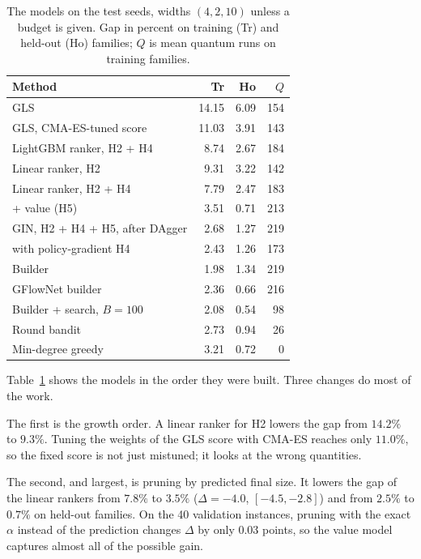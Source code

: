 \documentclass[10pt,pra,aps,twocolumn,superscriptaddress,floatfix,nofootinbib]{revtex4-2}
\newcommand{\GLS}{GLS}
\begin{document}
\begin{table}[t]
\caption{The models on the test seeds, widths $(4,2,10)$ unless a budget is given. Gap in percent on training (Tr) and held-out (Ho) families; $Q$ is mean quantum runs on training families.}
\label{tab:ladder}
\begin{ruledtabular}
\begin{tabular}{lrrr}
Method & Tr & Ho & $Q$ \\
\hline
\GLS{} & 14.15 & 6.09 & 154 \\
\GLS{}, CMA-ES-tuned score & 11.03 & 3.91 & 143 \\
LightGBM ranker, H2 + H4 & 8.74 & 2.67 & 184 \\
Linear ranker, H2 & 9.31 & 3.22 & 142 \\
Linear ranker, H2 + H4 & 7.79 & 2.47 & 183 \\
\quad + value (H5) & 3.51 & 0.71 & 213 \\
GIN, H2 + H4 + H5, after DAgger & 2.68 & 1.27 & 219 \\
\quad with policy-gradient H4 & 2.43 & 1.26 & 173 \\
Builder & 1.98 & 1.34 & 219 \\
GFlowNet builder & 2.36 & 0.66 & 216 \\
Builder + search, $B=100$ & 2.08 & 0.54 & 98 \\
Round bandit & 2.73 & 0.94 & 26 \\
\hline
Min-degree greedy & 3.21 & 0.72 & 0 \\
\end{tabular}
\end{ruledtabular}
\end{table}

Table~\ref{tab:ladder} shows the models in the order they were built. Three changes do most of the work.

The first is the growth order. A linear ranker for H2 lowers the gap from $14.2\%$ to $9.3\%$. Tuning the weights of the \GLS{} score with CMA-ES reaches only $11.0\%$, so the fixed score is not just mistuned; it looks at the wrong quantities.

The second, and largest, is pruning by predicted final size. It lowers the gap of the linear rankers from $7.8\%$ to $3.5\%$ ($\Delta = -4.0$, $[-4.5, -2.8]$) and from $2.5\%$ to $0.7\%$ on held-out families. On the 40 validation instances, pruning with the exact $\alpha$ instead of the prediction changes $\Delta$ by only 0.03 points, so the value model captures almost all of the possible gain.
\end{document}
